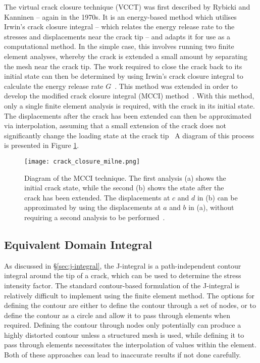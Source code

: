 The virtual crack closure technique (VCCT) was first described by Rybicki and Kanninen -- again in the 1970s. It is an energy-based method which utilises Irwin's crack closure integral -- which relates the energy release rate to the stresses and displacements near the crack tip -- and adapts it for use as a computational method. In the simple case, this involves running two finite element analyses, whereby the crack is extended a small amount by separating the mesh near the crack tip. The work required to close the crack back to its initial state can then be determined by using Irwin's crack closure integral to calculate the energy release rate $G$\ \cite{milne_numerical_2003}. This method was extended in order to develop the modified crack closure integral (MCCI) method\ \cite{rybicki_finite_1977}. With this method, only a single finite element analysis is required, with the crack in its initial state. The displacements after the crack has been extended can then be approximated via interpolation, assuming that a small extension of the crack does not significantly change the loading state at the crack tip\ \cite{kuna_fe-techniques_2013} A diagram of this process is presented in Figure \ref{fig:crack_closure_milne}.

\begin{figure}[H]
    \centering
    \texttt{[image: crack\_closure\_milne.png]}
    \caption{Diagram of the MCCI technique. The first analysis (a) shows the initial crack state, while the second (b) shows the state after the crack has been extended. The displacements at $c$ and $d$ in (b) can be approximated by using the displacements at $a$ and $b$ in (a), without requiring a second analysis to be performed\ \cite{milne_numerical_2003}.}
    \label{fig:crack_closure_milne}
\end{figure}

\subsection{Equivalent Domain Integral}\label{sec:equiv_domain}

As discussed in \S\ref{sec:j-integral}, the J-integral is a path-independent contour integral around the tip of a crack, which can be used to determine the stress intensity factor. The standard contour-based formulation of the J-integral is relatively difficult to implement using the finite element method. The options for defining the contour are either to define the contour through a set of nodes, or to define the contour as a circle and allow it to pass through elements when required. Defining the contour through nodes only potentially can produce a highly distorted contour unless a structured mesh is used, while defining it to pass through elements necessitates the interpolation of values within the element. Both of these approaches can lead to inaccurate results if not done carefully.

